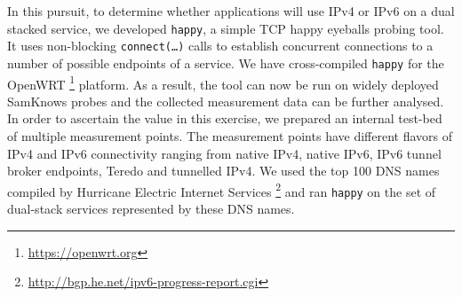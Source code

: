In this pursuit, to determine whether applications will use IPv4 or IPv6 on a
dual stacked service, we developed \texttt{happy}, a simple TCP happy eyeballs
probing tool. It uses non-blocking \texttt{connect(\ldots)} calls to establish
concurrent connections to a number of possible endpoints of a service.
We have cross-compiled \texttt{happy} for the OpenWRT
\footnote{\url{https://openwrt.org}} platform. As a result, the tool can now
be run on widely deployed SamKnows probes and the collected measurement data
can be further analysed. In order to ascertain the value in this exercise, we
prepared an internal test-bed of multiple measurement points. The measurement
points have different flavors of IPv4 and IPv6 connectivity ranging from
native IPv4, native IPv6, IPv6 tunnel broker endpoints, Teredo and tunnelled
IPv4. We used the top 100 DNS names compiled by Hurricane Electric Internet
Services \footnote{\url{http://bgp.he.net/ipv6-progress-report.cgi}} and ran
\texttt{happy} on the set of dual-stack services represented by these DNS
names.


